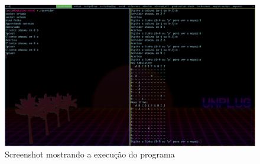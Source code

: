 \documentclass[11pt]{article}
\begin{document}
\begin{figure}[H]
    \centering
        \includegraphics[scale=.2]{scrot_batnaval.png}
    \caption{Screenshot mostrando a execução do programa}
    \label{fig:1}
\end{figure}
\end{document}
